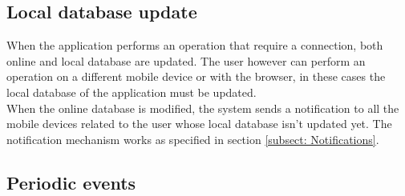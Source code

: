 \subsection{Local database update}
When the application performs an operation that require a connection, both online and local database are updated. The user however can perform an operation on a different mobile device or with the browser, in these cases the local database of the application must be updated.\\
When the online database is modified, the system sends a notification to all the mobile devices related to the user whose local database isn't updated yet. The notification mechanism works as specified in section \ref{subsect: Notifications}.

\subsection{Periodic events}
